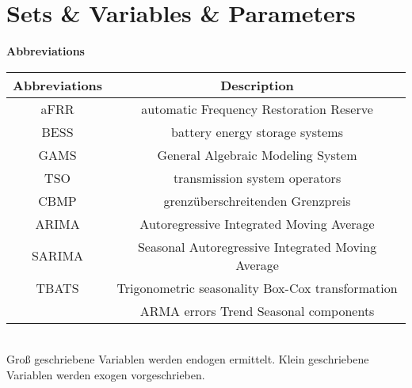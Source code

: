 \chapter*{Sets \& Variables \& Parameters}
\textbf{Abbreviations}
\begin{table}[!h]
	\begin{tabular}{c|c}
		\textbf{Abbreviations} & \textbf{Description}                              \\
		\hline
		aFRR                   & automatic Frequency Restoration Reserve           \\
		BESS                   & battery energy storage systems                    \\
		GAMS                   & General Algebraic Modeling System                 \\
		TSO                    & transmission system operators                     \\
		CBMP                   & grenzüberschreitenden Grenzpreis                  \\
		ARIMA                  & Autoregressive Integrated Moving Average          \\
		SARIMA                 & Seasonal Autoregressive Integrated Moving Average \\
		TBATS                  & Trigonometric seasonality Box-Cox transformation  \\
		                       & ARMA errors Trend Seasonal components             \\
	\end{tabular}
\end{table}\\

Groß geschriebene Variablen werden endogen ermittelt. Klein geschriebene Variablen werden exogen vorgeschrieben.\\

